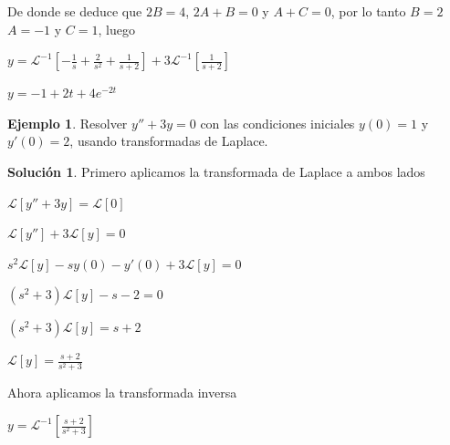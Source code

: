\documentclass{article}
\theoremstyle{plain}
\theoremstyle{definition}
\newtheorem{ejem}[thm]{Ejemplo}
\newtheorem{sol}[thm]{Solución}
\begin{document}
De donde se deduce que $2B=4$, $2A+B=0$ y $A+C=0$, por lo tanto $B=2$ $A=-1$ y $C=1$, luego


\begin{center}
$\displaystyle y = \mathcal{L}^{-1}\left[ -\frac{1}{s} +\frac{2}{s^2}+\frac{1}{s+2} \right] +  3\mathcal{L}^{-1} \left[ \frac{1}{s+2}\right] $
\end{center}


\begin{center}
$\displaystyle y = -1+2t+4e^{-2t} $
\end{center}


\begin{ejem}Resolver $y''+3y=0$  con las condiciones iniciales $y(0)=1$ y $y'(0)=2$, usando transformadas de Laplace.  \\
\end{ejem}

\begin{sol}Primero aplicamos la transformada de Laplace  a ambos lados
\end{sol}

\begin{center}
$\displaystyle \mathcal{L}[y''+3y]= \mathcal{L}[0]$
\end{center}

\begin{center}
$\displaystyle \mathcal{L}[y'']+3 \mathcal{L}[y]= 0$
\end{center}

\begin{center}
$\displaystyle s^2\mathcal{L}[y] -sy(0)-y'(0)+3 \mathcal{L}[y]= 0$
\end{center}

\begin{center}
$\displaystyle (s^2+3)\mathcal{L}[y] -s-2 = 0$
\end{center}

\begin{center}
$\displaystyle (s^2+3)\mathcal{L}[y] = s+2$
\end{center}

\begin{center}
$\displaystyle \mathcal{L}[y] = \frac{s+2}{s^2+3}$
\end{center}

Ahora aplicamos la transformada inversa


\begin{center}
$\displaystyle y = \mathcal{L}^{-1}\left[ \frac{s+2}{s^2+3} \right] $
\end{center}
\end{document}
